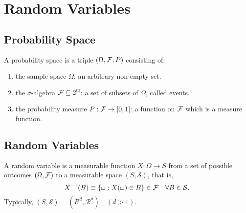 \chapter{Random Variables}


\section{Probability Space}

\begin{definition}
	A probability space is a triple $(\Omega,{\mathcal F},P)$ consisting of:
	\begin{enumerate}
		\item the sample space $\Omega$: an arbitrary non-empty set.
		\item the $\sigma$-algebra ${\mathcal F}\subseteq 2^{\Omega}$: a set of subsets of $\Omega$, called events.
		\item the probability measure $P:{\mathcal F} \rightarrow[0,1]$: a function on ${\mathcal F}$ which is a measure function.
	\end{enumerate}
\end{definition}

\section{Random Variables}

\begin{definition}
	A random variable is a measurable function $X:\Omega\rightarrow S$ from a set of possible outcomes $(\Omega,{\mathcal F})$ to a measurable space $(S,\mathcal{S})$, that is,
	\begin{equation}
		X^{-1}(B)\equiv\{\omega:X(\omega)\in B\}\in{\mathcal F}\quad \forall B\in\mathcal{S}.
	\end{equation}
	Typically, $(S,\mathcal{S})=(R^d,\mathcal{R}^d)\quad(d>1)$.
\end{definition}

